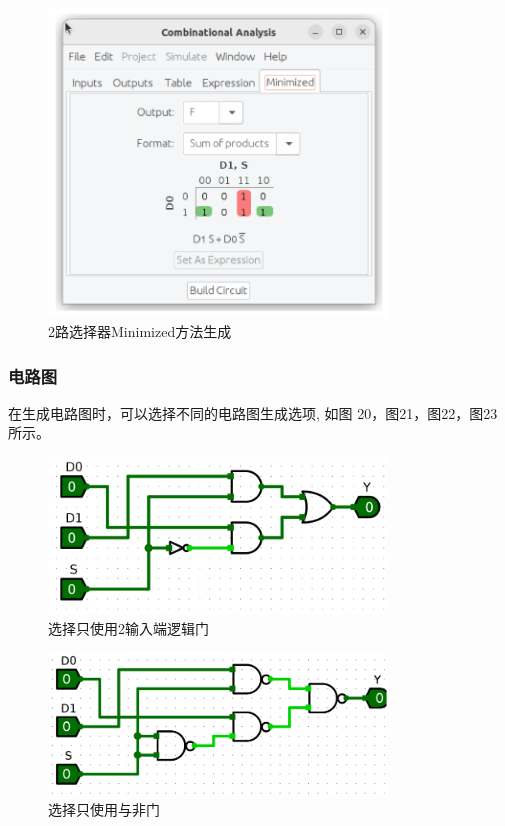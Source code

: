 \documentclass{article}
\begin{document}
    \begin{figure}[H]
    \centering
    \includegraphics[width=0.8\textwidth]{5.1.3.png}
    \caption{ 2路选择器Minimized方法生成}
    \end{figure}

    \subsubsection{电路图}
    在生成电路图时，可以选择不同的电路图生成选项, 如图 20，图21，图22，图23 所示。
    \begin{figure}[H]
    \centering
    \includegraphics[width=0.8\textwidth]{5.2.1.png}   
    \caption{选择只使用2输入端逻辑门}
    \end{figure}

    \begin{figure}[H]
    \centering
    \includegraphics[width=0.8\textwidth]{5.2.2.png}
    \caption{选择只使用与非门}
    \end{figure}
\end{document}
